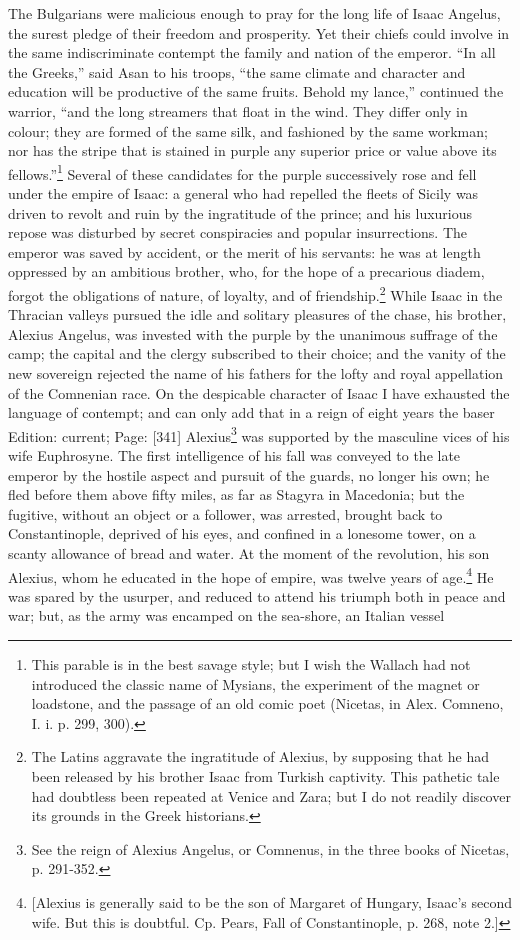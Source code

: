 The Bulgarians were malicious enough to pray for the long life of Isaac Angelus, the surest pledge of their freedom and prosperity. Yet their chiefs could involve in the same indiscriminate contempt the family and nation of the emperor. \texthebrew{“}In all the Greeks,\texthebrew{}” said Asan to his troops, \texthebrew{“}the same climate and character and education will be productive of the same fruits. Behold my lance,\texthebrew{}” continued the warrior, \texthebrew{“}and the long streamers that float in the wind. They differ only in colour; they are formed of the same silk, and fashioned by the same workman; nor has the stripe that is stained in purple any superior price or value above its fellows.\texthebrew{}”\footnote{This parable is in the best savage style; but I wish the Wallach had not introduced the classic name of Mysians, the experiment of the magnet or loadstone, and the passage of an old comic poet (Nicetas, in Alex. Comneno, I. i. p. 299, 300).} Several of these candidates for the purple successively rose and fell under the empire of Isaac: a general who had repelled the fleets of Sicily was driven to revolt and ruin by the ingratitude of the prince; and his luxurious repose was disturbed by secret conspiracies and popular insurrections. The emperor was saved by accident, or the merit of his servants: he was at length oppressed by an ambitious brother, who, for the hope of a precarious diadem, forgot the obligations of nature, of loyalty, and of friendship.\footnote{The Latins aggravate the ingratitude of Alexius, by supposing that he had been released by his brother Isaac from Turkish captivity. This pathetic tale had doubtless been repeated at Venice and Zara; but I do not readily discover its grounds in the Greek historians.} While Isaac in the Thracian valleys pursued the idle and solitary pleasures of the chase, his brother, Alexius Angelus, was invested with the purple by the unanimous suffrage of the camp; the capital and the clergy subscribed to their choice; and the vanity of the new sovereign rejected the name of his fathers for the lofty and royal appellation of the Comnenian race. On the despicable character of Isaac I have exhausted the language of contempt; and can only add that in a reign of eight years the baser Edition: current; Page: [341] Alexius\footnote{See the reign of Alexius Angelus, or Comnenus, in the three books of Nicetas, p. 291-352.} was supported by the masculine vices of his wife Euphrosyne. The first intelligence of his fall was conveyed to the late emperor by the hostile aspect and pursuit of the guards, no longer his own; he fled before them above fifty miles, as far as Stagyra in Macedonia; but the fugitive, without an object or a follower, was arrested, brought back to Constantinople, deprived of his eyes, and confined in a lonesome tower, on a scanty allowance of bread and water. At the moment of the revolution, his son Alexius, whom he educated in the hope of empire, was twelve years of age.\footnote{[Alexius is generally said to be the son of Margaret of Hungary, Isaac\texthebrew{}’s second wife. But this is doubtful. Cp. Pears, Fall of Constantinople, p. 268, note 2.]} He was spared by the usurper, and reduced to attend his triumph both in peace and war; but, as the army was encamped on the sea-shore, an Italian vessel 